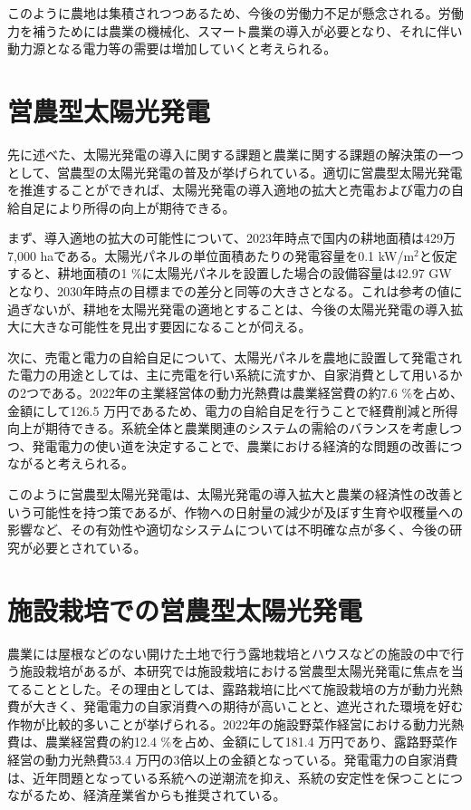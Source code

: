 \documentclass[uplatex,dvipdfmx,nomag,a4paper,oneside,onecolumn,12pt]{bxjsreport} %
\begin{document}
このように農地は集積されつつあるため、今後の労働力不足が懸念される。労働力を補うためには農業の機械化、スマート農業の導入が必要となり、それに伴い動力源となる電力等の需要は増加していくと考えられる。


\section{営農型太陽光発電}
先に述べた、太陽光発電の導入に関する課題と農業に関する課題の解決策の一つとして、営農型の太陽光発電の普及が挙げられている\cite{Keisansho2024}。適切に営農型太陽光発電を推進することができれば、太陽光発電の導入適地の拡大と売電および電力の自給自足により所得の向上が期待できる。

まず、導入適地の拡大の可能性について、2023年時点で国内の耕地面積は429万7,000 haである\cite{Kochimenseki2023}。太陽光パネルの単位面積あたりの発電容量を0.1 kW/m\(^2\)と仮定すると、耕地面積の1 \%に太陽光パネルを設置した場合の設備容量は42.97 GWとなり、2030年時点の目標までの差分と同等の大きさとなる。これは参考の値に過ぎないが、耕地を太陽光発電の適地とすることは、今後の太陽光発電の導入拡大に大きな可能性を見出す要因になることが伺える。

次に、売電と電力の自給自足について、太陽光パネルを農地に設置して発電された電力の用途としては、主に売電を行い系統に流すか、自家消費として用いるかの2つである。2022年の主業経営体の動力光熱費は農業経営費の約7.6 \%を占め、金額にして126.5 万円であるため、電力の自給自足を行うことで経費削減と所得向上が期待できる。系統全体と農業関連のシステムの需給のバランスを考慮しつつ、発電電力の使い道を決定することで、農業における経済的な問題の改善につながると考えられる。

このように営農型太陽光発電は、太陽光発電の導入拡大と農業の経済性の改善という可能性を持つ策であるが、作物への日射量の減少が及ぼす生育や収穫量への影響など、その有効性や適切なシステムについては不明確な点が多く、今後の研究が必要とされている。


\section{施設栽培での営農型太陽光発電}
農業には屋根などのない開けた土地で行う露地栽培とハウスなどの施設の中で行う施設栽培があるが、本研究では施設栽培における営農型太陽光発電に焦点を当てることとした。その理由としては、露路栽培に比べて施設栽培の方が動力光熱費が大きく、発電電力の自家消費への期待が高いことと、遮光された環境を好む作物が比較的多いことが挙げられる。2022年の施設野菜作経営における動力光熱費は、農業経営費の約12.4 \%を占め、金額にして181.4 万円であり、露路野菜作経営の動力光熱費53.4 万円の3倍以上の金額となっている\cite{Nogyokeiei2024}。発電電力の自家消費は、近年問題となっている系統への逆潮流を抑え、系統の安定性を保つことにつながるため、経済産業省からも推奨されている\cite{Keisansho2024}。
\end{document}
